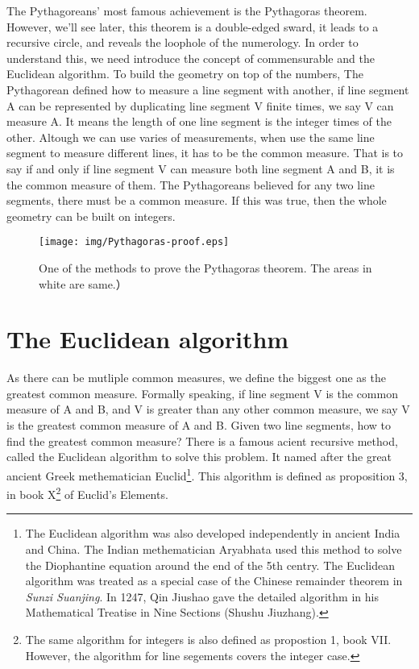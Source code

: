 \documentclass{article}
\begin{document}
The Pythagoreans' most famous achievement is the Pythagoras theorem. However, we'll see later, this theorem is a double-edged sward, it leads to a recursive circle, and reveals the loophole of the numerology. In order to understand this, we need introduce the concept of commensurable and the Euclidean algorithm. To build the geometry on top of the numbers, The Pythagorean defined how to measure a line segment with another, if line segment A can be represented by duplicating line segment V finite times, we say V can measure A. It means the length of one line segment is the integer times of the other. Altough we can use varies of measurements, when use the same line segment to measure different lines, it has to be the common measure. That is to say if and only if line segment V can measure both line segment A and B, it is the common measure of them. The Pythagoreans believed for any two line segments, there must be a common measure. If this was true, then the whole geometry can be built on integers.

\begin{figure}[htbp]
 \centering
 \texttt{[image: img/Pythagoras-proof.eps]}
 \caption{One of the methods to prove the Pythagoras theorem. The areas in white are same.）}
 \label{fig:Pythagoras-proof}
\end{figure}

\section{The Euclidean algorithm}

As there can be mutliple common measures, we define the biggest one as the greatest common measure. Formally speaking, if line segment V is the common measure of A and B, and V is greater than any other common measure, we say V is the greatest common measure of A and B. Given two line segments, how to find the greatest common measure? There is a famous acient recursive method, called the Euclidean algorithm to solve this problem. It named after the great ancient Greek methematician Euclid\footnote{The Euclidean algorithm was also developed independently in ancient India and China. The Indian methematician Aryabhata used this method to solve the Diophantine equation around the end of the 5th centry. The Euclidean algorithm was treated as a special case of the Chinese remainder theorem in {\em Sunzi Suanjing}. In 1247, Qin Jiushao gave the detailed algorithm in his Mathematical Treatise in Nine Sections (Shushu Jiuzhang).}. This algorithm is defined as proposition 3, in book X\footnote{The same algorithm for integers is also defined as propostion 1, book VII. However, the algorithm for line segements covers the integer case.} of Euclid's Elements\cite{Elements}.
\end{document}

